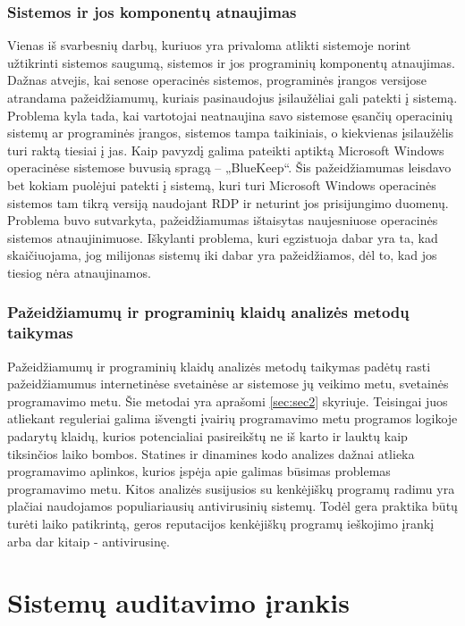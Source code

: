 \documentclass[a4paper,12pt,fleqn]{article}
\begin{document}
\subsubsection{Sistemos ir jos komponentų atnaujimas} 

Vienas iš svarbesnių darbų, kuriuos yra privaloma atlikti sistemoje norint užtikrinti sistemos saugumą, sistemos ir jos programinių komponentų atnaujimas. Dažnas atvejis, kai senose operacinės sistemos, programinės įrangos versijose atrandama pažeidžiamumų, kuriais pasinaudojus įsilaužėliai gali patekti į sistemą. Problema kyla tada, kai vartotojai neatnaujina savo sistemose ęsančių operacinių sistemų ar programinės įrangos, sistemos tampa taikiniais, o kiekvienas įsilaužėlis turi raktą tiesiai į jas. Kaip pavyzdį galima pateikti aptiktą Microsoft Windows operacinėse sistemose buvusią spragą – „BlueKeep“. Šis pažeidžiamumas leisdavo bet kokiam puolėjui patekti į sistemą, kuri turi Microsoft Windows operacinės sistemos tam tikrą versiją naudojant RDP ir neturint jos prisijungimo duomenų\cite{CVE-2019-0708}. Problema buvo sutvarkyta, pažeidžiamumas ištaisytas naujesniuose operacinės sistemos atnaujinimuose. Iškylanti problema, kuri egzistuoja dabar yra ta, kad skaičiuojama, jog milijonas sistemų iki dabar yra pažeidžiamos, dėl to, kad jos tiesiog nėra atnaujinamos\cite{sayan2019semantic}.

\subsubsection{Pažeidžiamumų ir programinių klaidų analizės metodų taikymas}

Pažeidžiamumų ir programinių klaidų analizės metodų taikymas padėtų rasti pažeidžiamumus internetinėse svetainėse ar sistemose jų veikimo metu, svetainės programavimo metu. Šie metodai yra aprašomi \ref{sec:sec2} skyriuje. Teisingai juos atliekant reguleriai galima išvengti įvairių programavimo metu programos logikoje padarytų klaidų, kurios potencialiai pasireikštų ne iš karto ir lauktų kaip tiksinčios laiko bombos. Statines ir dinamines kodo analizes dažnai atlieka programavimo aplinkos, kurios įspėja apie galimas būsimas problemas programavimo metu. Kitos analizės susijusios su kenkėjiškų programų radimu yra plačiai naudojamos populiariausių antivirusinių sistemų. Todėl gera praktika būtų turėti laiko patikrintą, geros reputacijos kenkėjiškų programų ieškojimo įrankį arba dar kitaip - antivirusinę.

\newpage
\section{Sistemų auditavimo įrankis}
\label{sec:motivation}
\end{document}
